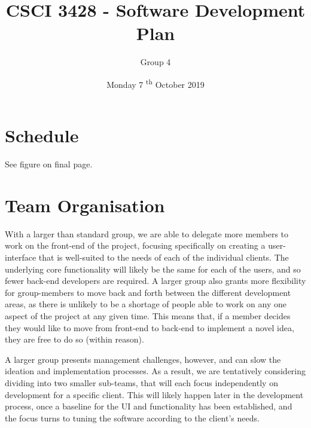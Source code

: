 \documentclass[11pt]{article}
\renewcommand{\headrulewidth}{.3pt}
\renewcommand{\footrulewidth}{.3pt}
\begin{document}
\title{CSCI 3428 - Software Development Plan}
\author{Group 4}
\date{Monday 7 \textsuperscript{th} October 2019}
\maketitle

\fancypagestyle{plain}{
\fancyhf{} %
\fancyfoot[r]{\footnotesize \thepage} %
\fancyfoot[l]{\small\scshape SDP} %
\renewcommand{\headrulewidth}{0pt}
\renewcommand{\footrulewidth}{.3pt}}

\section{Schedule}

See figure on final page.

\section{Team Organisation}
With a larger than standard group, we are able to delegate more members to work on the front-end of
the project, focusing specifically on creating a user-interface that is well-suited to the needs of
each of the individual clients. The underlying core functionality will likely be the same for each
of the users, and so fewer back-end developers are required. A larger group also grants more
flexibility for group-members to move back and forth between the different development areas, as
there is unlikely to be a shortage of people able to work on any one aspect of the project at any
given time. This means that, if a member decides they would like to move from front-end to back-end
to implement a novel idea, they are free to do so (within reason).

A larger group presents management challenges, however, and can slow the ideation and implementation
processes. As a result, we are tentatively considering dividing into two smaller sub-teams, that
will each focus independently on development for a specific client. This will likely
happen later in the development process, once a baseline for the UI and functionality has been
established, and the focus turns to tuning the software according to the client’s needs.
\end{document}
